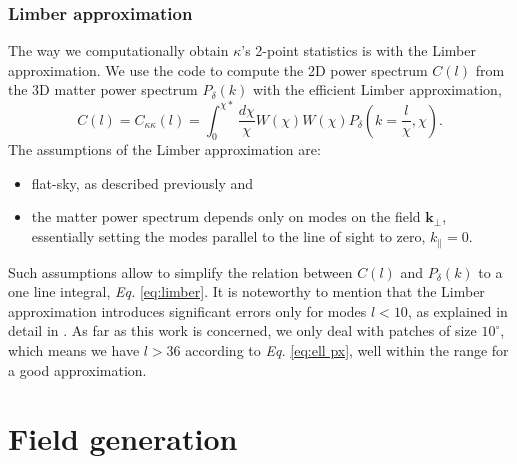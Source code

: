 \subsubsection{Limber approximation}
The way we computationally obtain $\kappa$'s 2-point statistics is with the Limber approximation. We use the code  \cite{jaxcosmo} to compute the 2D power spectrum $C(l)$ from the 3D matter power spectrum $P_\delta(k)$ with the efficient Limber approximation,
\begin{equation}
    C(l)=C_{\kappa\kappa}(l)=\int_0^{\chi*}\frac{d\chi}{\chi} W(\chi)W(\chi)P_\delta(k=\frac{l}{\chi},\chi).
    \label{eq:limber}
\end{equation}
The assumptions of the Limber approximation are:
\begin{itemize}
    \item flat-sky, as described previously and
    \item the matter power spectrum depends only on modes on the field $\bm{k}_\perp$, essentially setting the modes parallel to the line of sight to zero, $k_\parallel=0$.
\end{itemize}
Such assumptions allow to simplify the relation between $C(l)$ and $P_\delta(k)$ to a one line integral, \textit{Eq. }\eqref{eq:limber}. It is noteworthy to mention that the Limber approximation introduces significant errors only for modes $l<10$, as explained in detail in \cite{flatsky4}. As far as this work is concerned, we only deal with patches of size $10^{\circ}$, which means we have $l>36$ according to \textit{Eq. }\eqref{eq:ell px}, well within the range for a good approximation.


\section{Field generation}
\label{sec:field generation}
